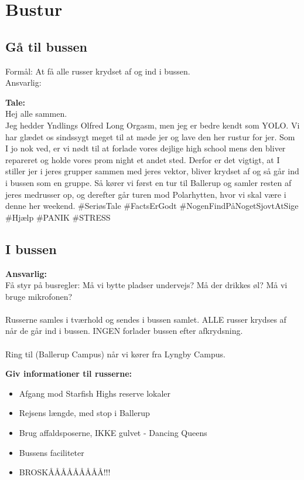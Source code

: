 \section{Bustur}
\subsection{Gå til bussen}
Formål: At få alle russer krydset af og ind i bussen.\\
Ansvarlig: \YOLO

\textbf{Tale:} \\
Hej alle sammen. \\
Jeg hedder Yndlings Olfred Long Orgasm, men jeg er bedre kendt som YOLO. Vi har glædet os sindssygt meget til at møde jer og lave den her rustur for jer. Som I jo nok ved, er vi nødt til at forlade vores dejlige high school mens den bliver repareret og holde vores prom night et andet sted. Derfor er det vigtigt, at I stiller jer i jeres grupper sammen med jeres vektor, bliver krydset af og så går ind i bussen som en gruppe. Så kører vi først en tur til Ballerup og samler resten af jeres medrusser op, og derefter går turen mod Polarhytten, hvor vi skal være i denne her weekend. \#SeriøsTale \#FactsErGodt \#NogenFindPåNogetSjovtAtSige \#Hjælp \#PANIK \#STRESS

\subsection{I bussen}
\textbf{Ansvarlig: \Ora}\\
Få styr på busregler: Må vi bytte pladser undervejs? Må der drikkes øl? Må vi bruge mikrofonen?\\\\
Russerne samles i tværhold og sendes i bussen samlet. ALLE russer krydses af når de går ind i bussen. INGEN forlader bussen efter afkrydsning.\\\\ 
Ring til \BIATCH (Ballerup Campus) når vi kører fra Lyngby Campus.

\textbf{Giv informationer til russerne:}
\begin{itemize}
\item Afgang mod Starfish Highs reserve lokaler
\item Rejsens længde, med stop i Ballerup
\item Brug affaldsposerne, IKKE gulvet - Dancing Queens
\item Bussens faciliteter
\item BROSKÅÅÅÅÅÅÅÅÅ!!!\\
\end{itemize}

